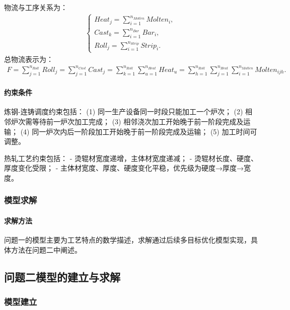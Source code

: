 \documentclass{whutmod}
\begin{document}
物流与工序关系为：
\begin{gather}
\left\{\begin{matrix}
Heat_j=\sum_{i=1}^{n_{Molten}}Molten_i,
\\Cast_k=\sum_{i=1}^{n_{Bar}}Bar_i,
\\ Roll_j=\sum_{i=1}^{n_{Strip}}Strip_i.
\end{matrix}\right.
\end{gather}
总物流表示为：
\begin{gather*}
F=\sum_{j=1}^{n_{Roll}}Roll_j=\sum_{j=1}^{n_{Cast}}Cast_j=\sum_{k=1}^{n_{Roll}}\sum_{u=1}^{n_{Heat}}Heat_u=\sum_{h=1}^{n_{Roll}}\sum_{j=1}^{n_{Heat}}\sum_{i=1}^{n_{Molten}}Molten_{ijh}.
\end{gather*}

\paragraph{约束条件}
炼钢-连铸调度约束包括：
(1) 同一生产设备同一时段只能加工一个炉次；
(2) 相邻炉次需等待前一炉次加工完成；
(3) 相邻浇次加工开始晚于前一阶段完成及运输；
(4) 同一炉次内后一阶段加工开始晚于前一阶段完成及运输；
(5) 加工时间可调整。

热轧工艺约束包括：
- 烫辊材宽度递增，主体材宽度递减；
- 烫辊材长度、硬度、厚度变化受限；
- 主体材宽度、厚度、硬度变化平稳，优先级为硬度→厚度→宽度。

\subsubsection{模型求解}
\paragraph{求解方法}
问题一的模型主要为工艺特点的数学描述，求解通过后续多目标优化模型实现，具体方法在问题二中阐述。

\subsection{问题二模型的建立与求解}
\subsubsection{模型建立}
\end{document}
